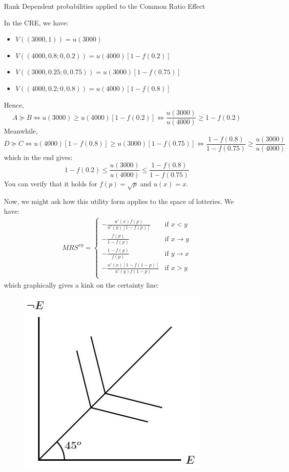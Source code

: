 \documentclass[12pt]{report}
\begin{document}
\begin{bclogo}[couleur=blue!10, arrondi=0.1, logo=,ombre=false]{ Rank Dependent probabilities applied to the Common Ratio Effect} 
\begin{small}
In the CRE, we have:\begin{itemize}
\item $V((3000,1)) = u(3000)$
\item $V((4000, 0.8;0,0.2)) = u(4000)[1 - f(0.2)]$
\item $V((3000, 0.25;0,0.75)) = u(3000)[1-f(0.75)]$
\item $V((4000, 0.2; 0, 0.8)) = u(4000)[1-f(0.8)]$
\end{itemize}
Hence, $$A\succeq B \Leftrightarrow u(3000) \geq u(4000)[1-f(0.2)] \Leftrightarrow \frac{u(3000)}{u(4000)} \geq 1 - f(0.2) $$
Meanwhile, $$D\succeq C \Leftrightarrow u(4000)[1-f(0.8)]\geq u(3000)[1-f(0.75)] \Leftrightarrow \frac{1-f(0.8)}{1-f(0.75)} \geq \frac{u(3000)}{u(4000)} $$ which in the end gives: $$ 1 - f(0.2)\leq\frac{u(3000)}{u(4000)} \leq \frac{1-f(0.8)}{1-f(0.75)} $$ You can verify that it holds for $f(p) = \sqrt{p}$ and $u(x) = x$.
\end{small}
\end{bclogo}

Now, we might ask how this utility form applies to the space of lotteries. We have:\begin{align*}MRS^{xy} = 
\begin{cases}
-\frac{u'(x)f(p)}{u'(y)[1 - f(p)]} & \text{if } x<y\\
-\frac{f(p)}{1-f(p)} & \text{if } x\to y\\
-\frac{1-f(p)}{f(p)} & \text{if } y\to x\\
-\frac{u'(x)[1-f(1-p)]}{u'(y)f(1-p)} & \text{if } x>y\\
\end{cases}
\end{align*}
which graphically gives a kink on the certainty line: \begin{figure}[ht!]
\centering
\includegraphics[scale=0.6]{images/rdprob}
\end{figure}
\end{document}
